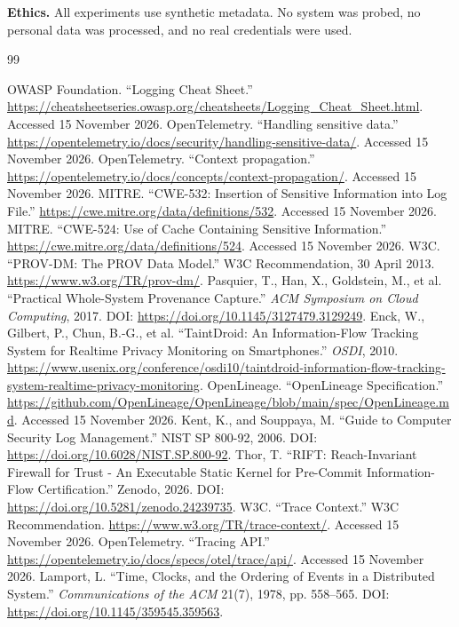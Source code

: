 \documentclass[11pt,letterpaper]{article}
\begin{document}
\textbf{Ethics.} All experiments use synthetic metadata. No system was probed, no personal data was processed, and no real credentials were used.

\begin{thebibliography}{99}
\small\raggedright
{} OWASP Foundation. ``Logging Cheat Sheet.'' \url{https://cheatsheetseries.owasp.org/cheatsheets/Logging_Cheat_Sheet.html}. Accessed 15 November 2026.
 OpenTelemetry. ``Handling sensitive data.'' \url{https://opentelemetry.io/docs/security/handling-sensitive-data/}. Accessed 15 November 2026.
 OpenTelemetry. ``Context propagation.'' \url{https://opentelemetry.io/docs/concepts/context-propagation/}. Accessed 15 November 2026.
 MITRE. ``CWE-532: Insertion of Sensitive Information into Log File.'' \url{https://cwe.mitre.org/data/definitions/532}. Accessed 15 November 2026.
 MITRE. ``CWE-524: Use of Cache Containing Sensitive Information.'' \url{https://cwe.mitre.org/data/definitions/524}. Accessed 15 November 2026.
 W3C. ``PROV-DM: The PROV Data Model.'' W3C Recommendation, 30 April 2013. \url{https://www.w3.org/TR/prov-dm/}.
 Pasquier, T., Han, X., Goldstein, M., et al. ``Practical Whole-System Provenance Capture.'' \emph{ACM Symposium on Cloud Computing}, 2017. DOI: \url{https://doi.org/10.1145/3127479.3129249}.
 Enck, W., Gilbert, P., Chun, B.-G., et al. ``TaintDroid: An Information-Flow Tracking System for Realtime Privacy Monitoring on Smartphones.'' \emph{OSDI}, 2010. \url{https://www.usenix.org/conference/osdi10/taintdroid-information-flow-tracking-system-realtime-privacy-monitoring}.
 OpenLineage. ``OpenLineage Specification.'' \url{https://github.com/OpenLineage/OpenLineage/blob/main/spec/OpenLineage.md}. Accessed 15 November 2026.
 Kent, K., and Souppaya, M. ``Guide to Computer Security Log Management.'' NIST SP 800-92, 2006. DOI: \url{https://doi.org/10.6028/NIST.SP.800-92}.
 Thor, T. ``RIFT: Reach-Invariant Firewall for Trust - An Executable Static Kernel for Pre-Commit Information-Flow Certification.'' Zenodo, 2026. DOI: \url{https://doi.org/10.5281/zenodo.24239735}.
 W3C. ``Trace Context.'' W3C Recommendation. \url{https://www.w3.org/TR/trace-context/}. Accessed 15 November 2026.
 OpenTelemetry. ``Tracing API.'' \url{https://opentelemetry.io/docs/specs/otel/trace/api/}. Accessed 15 November 2026.
 Lamport, L. ``Time, Clocks, and the Ordering of Events in a Distributed System.'' \emph{Communications of the ACM} 21(7), 1978, pp. 558--565. DOI: \url{https://doi.org/10.1145/359545.359563}.

\end{thebibliography}
\end{document}
